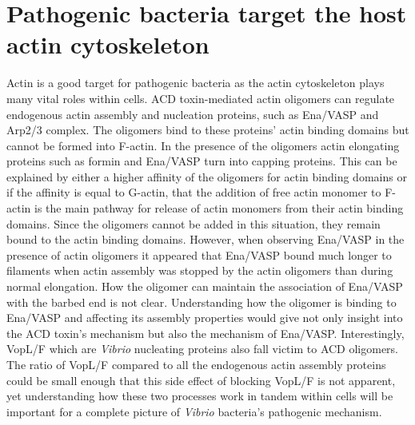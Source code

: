 \section{Pathogenic bacteria target the host actin cytoskeleton}\label{bacteria-conclusions}
Actin is a good target for pathogenic bacteria as the actin cytoskeleton plays many vital roles within cells. ACD toxin-mediated actin oligomers can regulate endogenous actin assembly and nucleation proteins, such as Ena/VASP and Arp2/3 complex. The oligomers bind to these proteins' actin binding domains but cannot be formed into F-actin. In the presence of the oligomers actin elongating proteins such as formin and Ena/VASP turn into capping proteins. This can be explained by either a higher affinity of the oligomers for actin binding domains or if the affinity is equal to G-actin, that the addition of free actin monomer to F-actin is the main pathway for release of actin monomers from their actin binding domains. Since the oligomers cannot be added in this situation, they remain bound to the actin binding domains. However, when observing Ena/VASP in the presence of actin oligomers it appeared that Ena/VASP bound much longer to filaments when actin assembly was stopped by the actin oligomers than during normal elongation. How the oligomer can maintain the association of Ena/VASP with the barbed end is not clear. Understanding how the oligomer is binding to Ena/VASP and affecting its assembly properties would give not only insight into the ACD toxin's mechanism but also the mechanism of Ena/VASP. Interestingly, VopL/F which are \textit{Vibrio} nucleating proteins also fall victim to ACD oligomers. The ratio of VopL/F compared to all the endogenous actin assembly proteins could be small enough that this side effect of blocking VopL/F is not apparent, yet understanding how these two processes work in tandem within cells will be important for a complete picture of \textit{Vibrio} bacteria's pathogenic mechanism. 

